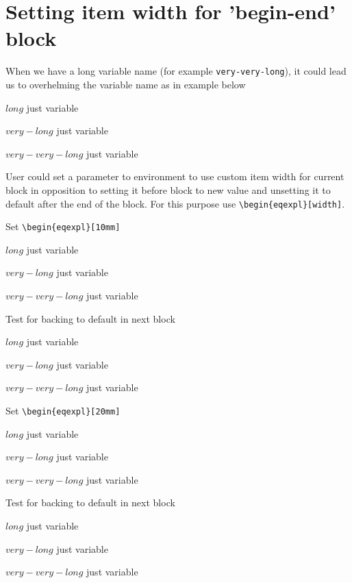 \documentclass{article}
\begin{document}
\eqexplSetItemWidth{5mm}

\section{Setting item width for 'begin-end' block}

When we have a long variable name (for example \verb+very-very-long+),
it could lead us to overhelming the variable name as in example below

\begin{eqexpl}
  \item{$long$} just variable
  \item{$very-long$} just variable
  \item{$very-very-long$} just variable
\end{eqexpl}

User could set a parameter to environment to use custom item width for
current block in opposition to setting it before block to new value
and unsetting it to default after the end of the block.  For this
purpose use \verb+\begin{eqexpl}[width]+.

Set \verb+\begin{eqexpl}[10mm]+
\begin{eqexpl}[10mm]
  \item{$long$} just variable
  \item{$very-long$} just variable
  \item{$very-very-long$} just variable
\end{eqexpl}

Test for backing to default in next block
\begin{eqexpl}
  \item{$long$} just variable
  \item{$very-long$} just variable
  \item{$very-very-long$} just variable
\end{eqexpl}

Set \verb+\begin{eqexpl}[20mm]+
\begin{eqexpl}[20mm]
  \item{$long$} just variable
  \item{$very-long$} just variable
  \item{$very-very-long$} just variable
\end{eqexpl}

Test for backing to default in next block
\begin{eqexpl}
  \item{$long$} just variable
  \item{$very-long$} just variable
  \item{$very-very-long$} just variable
\end{eqexpl}
\end{document}

